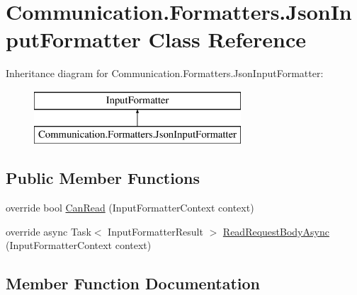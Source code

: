 \hypertarget{class_communication_1_1_formatters_1_1_json_input_formatter}{}\section{Communication.\+Formatters.\+Json\+Input\+Formatter Class Reference}
\label{class_communication_1_1_formatters_1_1_json_input_formatter}
Inheritance diagram for Communication.\+Formatters.\+Json\+Input\+Formatter\+:\begin{figure}[H]
\begin{center}
\leavevmode
\includegraphics[height=2.000000cm]{class_communication_1_1_formatters_1_1_json_input_formatter}
\end{center}
\end{figure}
\subsection*{Public Member Functions}
\begin{DoxyCompactItemize}
\item 
override bool \mbox{\hyperlink{class_communication_1_1_formatters_1_1_json_input_formatter_a7e9bfac22f7e8b5c8e9b890c992109bb}{Can\+Read}} (Input\+Formatter\+Context context)
\item 
override async Task$<$ Input\+Formatter\+Result $>$ \mbox{\hyperlink{class_communication_1_1_formatters_1_1_json_input_formatter_a419451e6045e0c5ebca0d71496437c21}{Read\+Request\+Body\+Async}} (Input\+Formatter\+Context context)
\end{DoxyCompactItemize}


\subsection{Member Function Documentation}
\mbox{\label{class_communication_1_1_formatters_1_1_json_input_formatter_a7e9bfac22f7e8b5c8e9b890c992109bb}} 
